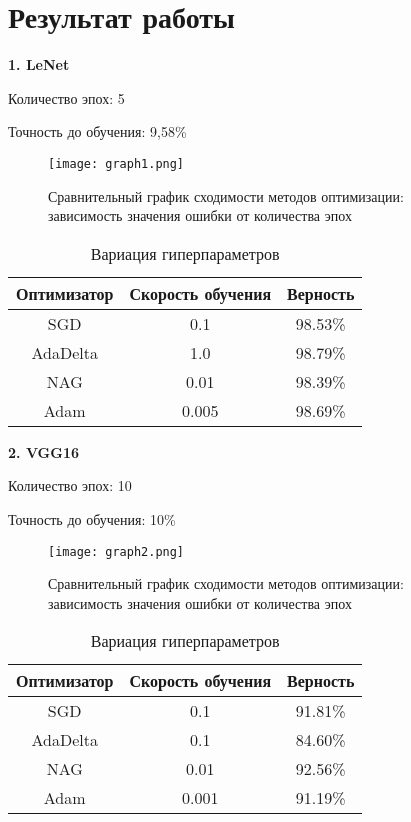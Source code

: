 \documentclass[a4paper, 14pt]{extarticle}
\begin{document}
\section{Результат работы}\label{Sect::res}

\textbf{1. LeNet}

Количество эпох: 5

Точность до обучения: 9,58\%

\begin{figure}[h]
    \centering
    \texttt{[image: graph1.png]}
    \caption{Сравнительный график сходимости методов оптимизации:\\ зависимость значения ошибки от количества эпох}
    \label{fig:enter-label5}
\end{figure}

\begin{table}[h]
\centering
\caption{Вариация гиперпараметров}
\begin{tabular}{|c|c|c|}
\hline
Оптимизатор & Скорость обучения & Верность \\
\hline
SGD  & 0.1 & 98.53\% \\
AdaDelta & 1.0 & 98.79\% \\
NAG & 0.01 & 98.39\% \\
Adam & 0.005 & 98.69\% \\
\hline
\end{tabular}
\end{table}

\textbf{2. VGG16}

Количество эпох: 10

Точность до обучения: 10\%

\begin{figure}[h]
    \centering
    \texttt{[image: graph2.png]}
    \caption{Сравнительный график сходимости методов оптимизации:\\ зависимость значения ошибки от количества эпох}
    \label{fig:enter-label5}
\end{figure}

\begin{table}[h]
\centering
\caption{Вариация гиперпараметров}
\begin{tabular}{|c|c|c|}
\hline
Оптимизатор & Скорость обучения & Верность \\
\hline
SGD & 0.1 & 91.81\% \\
AdaDelta & 0.1 & 84.60\% \\
NAG & 0.01 & 92.56\% \\
Adam & 0.001 & 91.19\% \\
\hline
\end{tabular}
\end{table}
\end{document}
